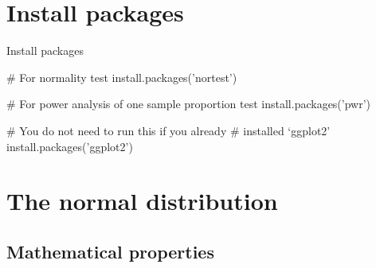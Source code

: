 \documentclass[12pt, t, xcolor=dvipsnames]{beamer}
\begin{document}
\section{Install packages}

\begin{frame}[fragile]{Install packages}
\begin{Rcode}
# For normality test
install.packages('nortest')

# For power analysis of one sample proportion test
install.packages('pwr')

# You do not need to run this if you already
# installed `ggplot2'
install.packages('ggplot2')
\end{Rcode}
\end{frame}

\section{The normal distribution}

\subsection{Mathematical properties}
\end{document}
